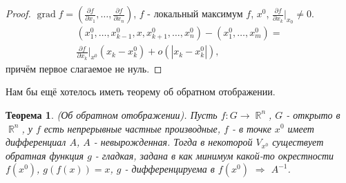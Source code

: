 \documentclass[a4paper,100pt]{article}
\theoremstyle{indented}
\newtheorem{theorem}{Теорема}
\theoremstyle{definition}
\theoremstyle{remark}
\DeclareMathOperator{\RR}{\mathbb{R}}
\DeclareMathOperator{\grad}{grad}
\begin{document}
\begin{proof}
    $\grad f = (\frac{\partial f}{\partial x_1} ,\ldots, \frac{\partial f}{\partial x_n})$, $f$ - локальный максимум $f$, $x^0$, $\frac{\partial f}{\partial x_k}\bigg|_{x_0}\neq 0$. 
    \begin{equation*}
        \begin{split}
            (x_1^0, \ldots, x_{k-1}^0, x, x_{k+1}^0, \ldots, x_n^0)- (x_1^0,\ldots, x_m^0)= \\
            \frac{\partial f}{\partial x_k}\bigg|_{x^0}(x_k-x_k^0)+o(|x_k-x_k^0|),
        \end{split}
    \end{equation*}
    причём первое слагаемое не нуль.
\end{proof} 
 
Нам бы ещё хотелось иметь теорему об обратном отображении. \\

\begin{theorem}
    (Об обратном отображении). Пусть $f: G\rightarrow \RR^n$, $G$ - открыто в $\RR^n$, у $f$ есть непрерывные частные производные, $f$ - в точке $x^0$ имеет дифференциал $A$, $A$ - невырожденная. Тогда в некоторой $V_{x^0}$ существует обратная функция $g$ - гладкая, задана в как минимум какой-то окрестности $f(x^0)$, $g(f(x))=x$, $g$ - дифференцируема в $f(x^0)$ $\Rightarrow$ $A^{-1}$. 
\end{theorem}
\end{document}
